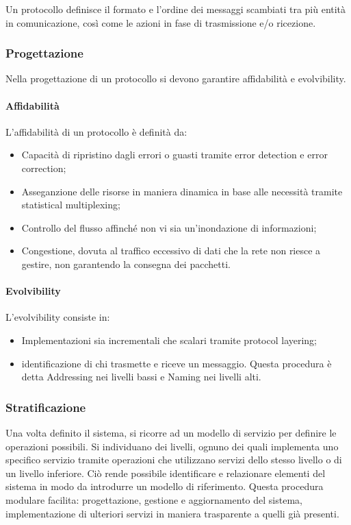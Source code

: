 \documentclass{subfiles}
\begin{document}
    Un protocollo definisce il formato e l'ordine dei messaggi scambiati tra più entità in comunicazione, così come le azioni in fase 
    di trasmissione e/o ricezione.
    
\subsubsection{Progettazione}
    Nella progettazione di un protocollo si devono garantire affidabilità e evolvibility.

    \paragraph{Affidabilità}
    L'affidabilità di un protocollo è definità da:
    \begin{itemize}
        \item Capacità di ripristino dagli errori o guasti tramite error detection e error correction;
        \item Asseganzione delle risorse in maniera dinamica in base alle necessità tramite statistical multiplexing;
        \item Controllo del flusso affinché non vi sia un'inondazione di informazioni;
        \item Congestione, dovuta al traffico eccessivo di dati che la rete non riesce a gestire, non garantendo la consegna dei 
        pacchetti. 
    \end{itemize}

    \paragraph{Evolvibility}
    L'evolvibility consiste in:
    \begin{itemize}
        \item Implementazioni sia incrementali che scalari tramite protocol layering;
        \item identificazione di chi trasmette e riceve un messaggio. Questa procedura è detta Addressing nei livelli bassi e Naming 
        nei livelli alti.
    \end{itemize}

\subsubsection{Stratificazione}
    Una volta definito il sistema, si ricorre ad un modello di servizio per definire le operazioni possibili. Si individuano dei livelli, 
    ognuno dei quali implementa uno specifico servizio tramite operazioni che utilizzano servizi dello stesso livello o di un livello 
    inferiore. Ciò rende possibile identificare e relazionare elementi del sistema in modo da introdurre un modello di riferimento. 
    Questa procedura modulare facilita: progettazione, gestione e aggiornamento del sistema, implementazione di ulteriori servizi in 
    maniera trasparente a quelli già presenti.
\end{document}
